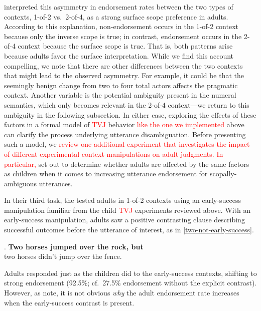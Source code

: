 \documentclass[preprint,authoryear]{elsarticle}\frenchspacing
\newcommand{\lp}[1]{\textcolor{red}{#1}} %
\begin{document}
\citeauthor{musolinolidz2003} interpreted this asymmetry in endorsement rates between the two types of contexts, 1-of-2 vs.~2-of-4, as a strong {surface} scope preference in adults. According to this explanation,  non-endorsement occurs in the 1-of-2 context because only the {inverse} scope is true; in contrast, endorsement occurs in the 2-of-4 context because the {surface} scope is true. That is, both patterns arise because adults favor the {surface} interpretation. While we find this account compelling, we note that there are other differences between the two contexts that might lead to the observed asymmetry. For example, it could be that the seemingly benign change from two to four total actors affects the pragmatic context. Another variable is the potential ambiguity present in the numeral semantics, which only becomes relevant in the 2-of-4 context---we return to this ambiguity in the following subsection. In either case, exploring the effects of these factors in a formal model of 
\lp{TVJ}
behavior \lp{like the one we implemented} above can clarify the process underlying utterance disambiguation. Before presenting such a model, we \lp{review one additional experiment}
\lp{that investigates the impact of different experimental context manipulations on adult judgments.}
\lp{In particular, }
\citeauthor{musolinolidz2003} set out to determine whether adults are affected by the same factors as children when it comes to increasing utterance endorsement for scopally-ambiguous utterances. 

In their third task, the \citeauthor{musolinolidz2003} tested adults in  1-of-2 contexts using an early-success manipulation familiar from the child 
\lp{TVJ}
experiments reviewed above. With an early-success manipulation, adults saw a positive contrasting clause describing successful outcomes before the utterance of interest, as in \ref{two-not-early-success}.

\ex. \label{two-not-early-success} \textbf{{Two horses jumped over the rock, but}} \\
{two horses didn't jump over the fence.}

Adults responded just as the children did to the early-success contexts, shifting to strong endorsement (92.5\%; cf.~27.5\% endorsement without the explicit contrast).  However, as \citeauthor{musolinolidz2003} note, it is not obvious \emph{why} the adult endorsement rate increases when the early-success contrast is present. 
\end{document}
